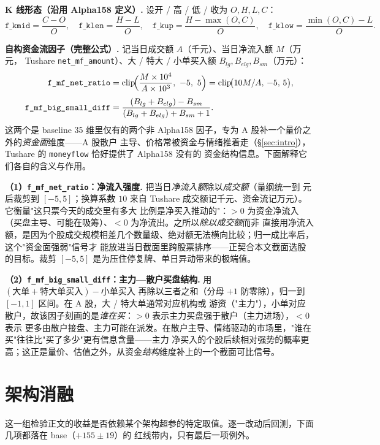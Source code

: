 \documentclass[a4paper,11pt,fontset=fandol]{ctexart}
\begin{document}
\noindent\textbf{\heiti K 线形态（沿用 Alpha158 定义）.} 设开 / 高 / 低 / 收为 $O,H,L,C$：
\[
\texttt{f\_kmid}=\frac{C-O}{O},\quad \texttt{f\_klen}=\frac{H-L}{O},\quad
\texttt{f\_kup}=\frac{H-\max(O,C)}{O},\quad \texttt{f\_klow}=\frac{\min(O,C)-L}{O}.
\]

\noindent\textbf{\heiti 自构资金流因子（完整公式）.} 记当日成交额 $A$（千元）、当日净流入额 $M$（万元，
Tushare \texttt{net\_mf\_amount}）、大 / 特大 / 小单买入额 $B_{lg},B_{elg},B_{sm}$（万元）：
\begin{align*}
\text{\texttt{f\_mf\_net\_ratio}} &= \mathrm{clip}\!\Big(\frac{M\times 10^{4}}{A\times 10^{3}},\ -5,\ 5\Big)
= \mathrm{clip}\!\big(10M/A,\,-5,\,5\big),\\[3pt]
\text{\texttt{f\_mf\_big\_small\_diff}} &= \frac{(B_{lg}+B_{elg})-B_{sm}}{(B_{lg}+B_{elg})+B_{sm}+1}.
\end{align*}
这两个是 baseline 35 维里仅有的两个非 Alpha158 因子，专为 A 股补一个量价之外的\emph{资金面}维度——A 股散户
主导、价格常被资金与情绪推着走（§\ref{sec:intro}），Tushare 的 \texttt{moneyflow} 恰好提供了 Alpha158 没有的
资金结构信息。下面解释它们各自的含义与作用。

\textbf{\heiti （1）\texttt{f\_mf\_net\_ratio}：净流入强度.} 把当日\emph{净流入额}除以\emph{成交额}（量纲统一到
元后裁剪到 $[-5,5]$；换算系数 $10$ 来自 Tushare 成交额记千元、资金流记万元）。它衡量"这只票今天的成交里有多大
比例是净买入推动的"：$>0$ 为资金净流入（买盘主导、可能在吸筹）、$<0$ 为净流出。之所以\emph{除以成交额}而非
直接用净流入额，是因为个股成交规模相差几个数量级、绝对额无法横向比较；归一成比率后，这个"资金面强弱"信号才
能放进当日截面里跨股票排序——正契合本文截面选股的目标。裁剪 $[-5,5]$ 是为压住停复牌、单日异动带来的极端值。

\textbf{\heiti （2）\texttt{f\_mf\_big\_small\_diff}：主力—散户买盘结构.} 用 $(\text{大单}+\text{特大单买入})-
\text{小单买入}$ 再除以三者之和（分母 $+1$ 防零除），归一到 $[-1,1]$ 区间。在 A 股，大 / 特大单通常对应机构或
游资（"主力"），小单对应散户，故该因子刻画的是\emph{谁在买}：$>0$ 表示主力买盘强于散户（主力进场），$<0$ 表示
更多由散户接盘、主力可能在派发。在散户主导、情绪驱动的市场里，"谁在买"往往比"买了多少"更有信息含量——主力
净买入的个股后续相对强势的概率更高；这正是量价、估值之外，从资金\emph{结构}维度补上的一个截面可比信号。

\section{架构消融}\label{sec:abl-arch}
这一组检验正文的收益是否依赖某个架构超参的特定取值。逐一改动后回测，下面几项都落在 base（$+155\pm19$）的
红线带内，只有最后一项例外。
\end{document}
